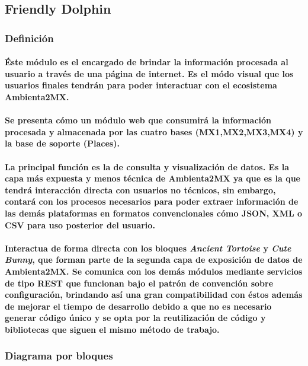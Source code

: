   \subsection{Friendly Dolphin}
    \subsubsection{Definición}
      \paragraph{Éste módulo es el encargado de brindar la información procesada al usuario a través de una página de internet. Es el módo visual que los usuarios finales tendrán para poder interactuar con el ecosistema Ambienta2MX.}
      \paragraph{Se presenta cómo un módulo web que consumirá la información procesada y almacenada por las cuatro bases (MX1,MX2,MX3,MX4) y la base de soporte (Places).}
      \paragraph{La principal función es la de consulta y visualización de datos. Es la capa más expuesta y menos técnica de Ambienta2MX ya que es la que tendrá interacción directa con usuarios no técnicos, sin embargo, contará con los procesos necesarios para poder extraer información de las demás plataformas en formatos convencionales cómo JSON, XML o CSV para uso posterior del usuario.}
      \paragraph{Interactua de forma directa con los bloques \textbf{\emph{Ancient Tortoise}} y \textbf{\emph{Cute Bunny}}, que forman parte de la segunda capa de exposición de datos de Ambienta2MX. Se comunica con los demás módulos mediante servicios de tipo REST que funcionan bajo el patrón de convención sobre configuración\cite{8}, brindando así una gran compatibilidad con éstos además de mejorar el tiempo de desarrollo debido a que no es necesario generar código único y se opta por la reutilización de código y bibliotecas que siguen el mismo método de trabajo.}
  \subsubsection{Diagrama por bloques}
